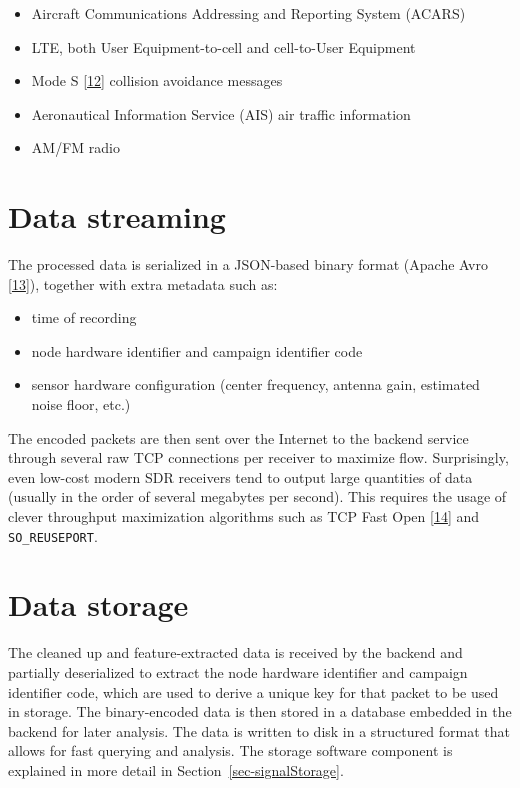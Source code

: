 \documentclass[
  letterpaper,
  a4paper,
  12pt,
  titlepage,
  oneside,
  openany]{book}
\providecommand{\tightlist}{%
  \setlength{\itemsep}{0pt}\setlength{\parskip}{0pt}}\usepackage{longtable,booktabs,array}
\begin{document}
\begin{itemize}
\tightlist
\item
  Aircraft Communications Addressing and Reporting System (ACARS)
\item
  LTE, both User Equipment-to-cell and cell-to-User Equipment
\item
  Mode S
  \protect\hyperlink{ref-internationalcivilaviationorganizationManualModeSpecific2004}{{[}12{]}}
  collision avoidance messages
\item
  Aeronautical Information Service (AIS) air traffic information
\item
  AM/FM radio
\end{itemize}

\hypertarget{data-streaming}{%
\section{Data streaming}\label{data-streaming}}

The processed data is serialized in a JSON-based binary format (Apache
Avro \protect\hyperlink{ref-ApacheAvroDocumentation}{{[}13{]}}),
together with extra metadata such as:

\begin{itemize}
\tightlist
\item
  time of recording
\item
  node hardware identifier and campaign identifier code
\item
  sensor hardware configuration (center frequency, antenna gain,
  estimated noise floor, etc.)
\end{itemize}

The encoded packets are then sent over the Internet to the backend
service through several raw TCP connections per receiver to maximize
flow. Surprisingly, even low-cost modern SDR receivers tend to output
large quantities of data (usually in the order of several megabytes per
second). This requires the usage of clever throughput maximization
algorithms such as TCP Fast Open
\protect\hyperlink{ref-radhakrishnanTCPFastOpen2011}{{[}14{]}} and
\texttt{SO\_REUSEPORT}.

\hypertarget{data-storage}{%
\section{Data storage}\label{data-storage}}

The cleaned up and feature-extracted data is received by the backend and
partially deserialized to extract the node hardware identifier and
campaign identifier code, which are used to derive a unique key for that
packet to be used in storage. The binary-encoded data is then stored in
a database embedded in the backend for later analysis. The data is
written to disk in a structured format that allows for fast querying and
analysis. The storage software component is explained in more detail in
Section~\ref{sec-signalStorage}.
\end{document}
